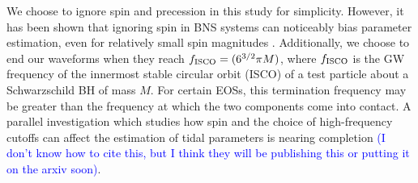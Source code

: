 \documentclass[twocolumn,prd,amssymb,aps,nofootinbib,showpacs,epsf]{revtex4}
\newcommand{\red}{\textcolor{red}}
\newcommand\les[2]{\textcolor{blue}{{#1}\sout{#2}}}
\begin{document}
We choose to ignore spin and precession in this study for simplicity.  However, it has been shown that ignoring spin in BNS systems can noticeably bias parameter estimation, even for relatively small spin magnitudes \cite{Favata2014}.  Additionally, we choose to end our waveforms when they reach $f_{\rm ISCO}=(6^{3/2}\pi M)$, where $f_{\rm ISCO}$ is the GW frequency of the innermost stable circular orbit (ISCO) of a test particle about a Schwarzschild BH of mass $M$.  For certain EOSs, this termination frequency may be greater than the frequency at which the two components come into contact.  A parallel investigation which studies how spin and the choice of high-frequency cutoffs can affect the estimation of tidal parameters is nearing completion \cite{Nikhef_paper_2} \les{(I don't know how to cite this, but I think they will be publishing this or putting it on the arxiv soon)}{}.

\end{document}
